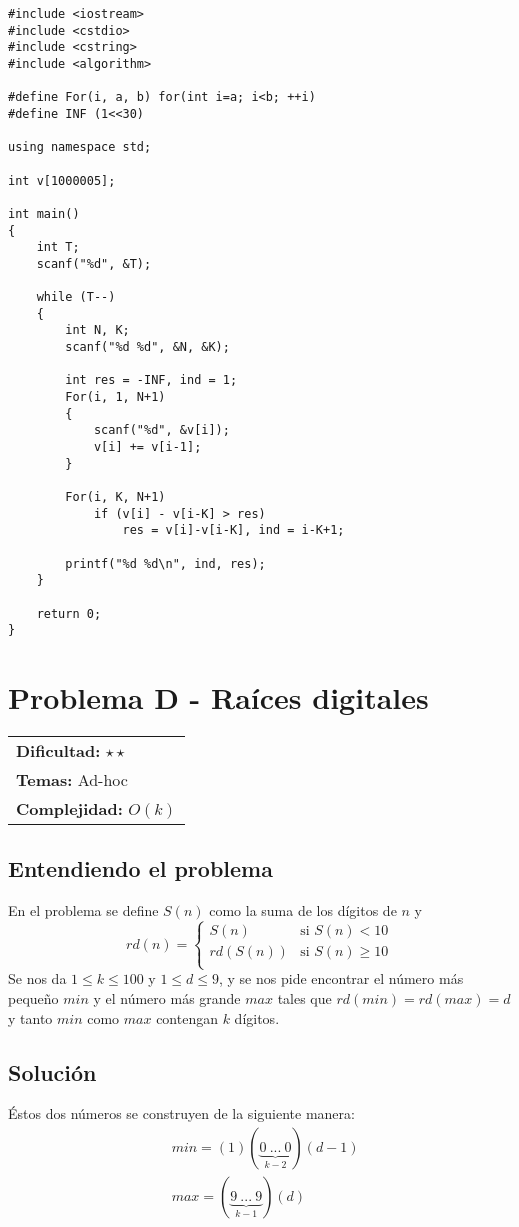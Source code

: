 \begin{verbatim}
#include <iostream>
#include <cstdio>
#include <cstring>
#include <algorithm>
 
#define For(i, a, b) for(int i=a; i<b; ++i)
#define INF (1<<30)
 
using namespace std;
 
int v[1000005];
 
int main()
{
    int T;
    scanf("%d", &T);
 
    while (T--)
    {
        int N, K;
        scanf("%d %d", &N, &K);
 
        int res = -INF, ind = 1;
        For(i, 1, N+1)
        {
            scanf("%d", &v[i]);
            v[i] += v[i-1];
        }
 
        For(i, K, N+1)
            if (v[i] - v[i-K] > res)
                res = v[i]-v[i-K], ind = i-K+1;
 
        printf("%d %d\n", ind, res);
    }
 
    return 0;
}
\end{verbatim}

\section{Problema D - Raíces digitales}

\hfill
\begin{tabular}{@{}l@{}}
\textbf{Dificultad:} $\star \star$ \\
\textbf{Temas:} Ad-hoc \\
\textbf{Complejidad:} $O(k)$
\end{tabular}

\subsection*{Entendiendo el problema}
En el problema se define $S(n)$ como la suma de los dígitos de $n$ y
\[
rd(n) =
\left\{
	\begin{array}{ll}
		S(n)     & \mbox{si } S(n) < 10 \\
		rd(S(n)) & \mbox{si } S(n) \geq 10   \\
	\end{array}
\right.
\]
Se nos da $1 \leq k \leq 100$ y $1 \leq d \leq 9$, y se nos pide encontrar el número más pequeño $min$ y el número más grande $max$ tales que $rd(min) = rd(max) = d$ y tanto $min$ como $max$ contengan $k$ dígitos. 
\subsection*{Solución}
Éstos dos números se construyen de la siguiente manera:
\begin{align*}
& min = (1)(\underbrace{0\ ...\ 0 }_{k-2})(d-1) \\
& max = (\underbrace{9\ ...\ 9}_{k-1})(d)
\end{align*}
